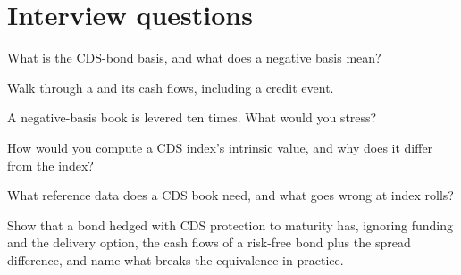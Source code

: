 \section{Interview questions}

\begin{interviewq}\label{iq:s2:credit-relative-value:1}
What is the CDS-bond basis, and what does a negative basis mean?
\end{interviewq}

\begin{interviewq}\label{iq:s2:credit-relative-value:2}
Walk through a  and its cash flows, including a credit event.
\end{interviewq}

\begin{interviewq}\label{iq:s2:credit-relative-value:3}
A negative-basis book is levered ten times. What would you stress?
\end{interviewq}

\begin{interviewq}\label{iq:s2:credit-relative-value:4}
How would you compute a CDS index's intrinsic value, and why does it differ from the index?
\end{interviewq}

\begin{interviewq}\label{iq:s2:credit-relative-value:5}
What reference data does a CDS book need, and what goes wrong at index rolls?
\end{interviewq}

\begin{interviewq}\label{iq:s2:credit-relative-value:6}
Show that a bond hedged with CDS protection to maturity has, ignoring funding and the delivery option, the cash flows of a risk-free bond plus the
spread difference, and name what breaks the equivalence in practice.
\end{interviewq}
